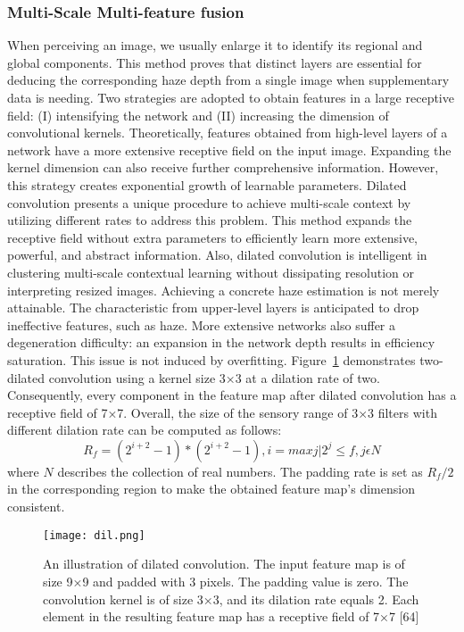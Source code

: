 \documentclass[doctor,english,listoffigures,listoftables]{thesis-uestc}
\begin{document}
\subsubsection{Multi-Scale Multi-feature fusion }
When perceiving an image, we usually enlarge it to identify its regional and global components. This method proves that distinct layers are essential for deducing the corresponding haze depth from a single image when supplementary data is needing. Two strategies are adopted to obtain features in a large receptive field: (I) intensifying the network and (II) increasing the dimension of convolutional kernels. Theoretically, features obtained from high-level layers of a network have a more extensive receptive field on the input image. Expanding the kernel dimension can also receive further comprehensive information. However, this strategy creates exponential growth of learnable parameters. Dilated convolution presents a unique procedure to achieve multi-scale context by utilizing different rates to address this problem. This method expands the receptive field without extra parameters to efficiently learn more extensive, powerful, and abstract information. Also, dilated convolution is intelligent in clustering multi-scale contextual learning without dissipating resolution or interpreting resized images. Achieving a concrete haze estimation is not merely attainable. The characteristic from upper-level layers is anticipated to drop ineffective features, such as haze. More extensive networks also suffer a degeneration difficulty: an expansion in the network depth results in efficiency saturation. This issue is not induced by overfitting. Figure~\ref{dil} demonstrates two-dilated convolution using a kernel size 3×3 at a dilation rate of two. Consequently, every component in the feature map after dilated convolution has a receptive field of 7×7. Overall, the size of the sensory range of 3×3 filters with different dilation rate can be computed as follows:
\begin{equation}
	R_f=(2^{i+2} -1) * (2^{i+2} -1), i= max {j|2^j \leq f, j \epsilon N}
\end{equation}	
where $N$ describes the collection of real numbers. The padding rate is set as $R_f/2$ in the corresponding region to make the obtained feature map's dimension consistent. 
\begin{figure}[H]
\begin{center}
\texttt{[image: dil.png]}
\caption{An illustration of dilated convolution. The input feature map is of size 9×9 and padded with 3 pixels. The padding value is zero. The convolution kernel is of size 3×3, and its dilation rate equals 2. Each element in the resulting feature map has a receptive field of 7×7 [64]}
\label{dil}
\end{center}
\end{figure} 
\end{document}
